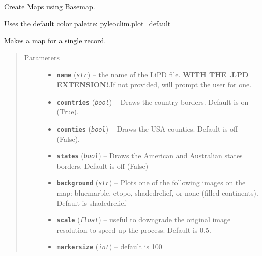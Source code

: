 \documentclass[letterpaper,10pt,english]{sphinxmanual}
\begin{document}
\begin{fulllineitems}
\label{Mapping:pyleoclim.Map}
Create Maps using Basemap.

Uses the default color palette: pyleoclim.plot\_default

\begin{fulllineitems}
\label{Mapping:pyleoclim.Map.map_Lipd}
Makes a map for a single record.
\begin{quote}\begin{description}
\item[{Parameters}] \leavevmode\begin{itemize}
\item {} 
\textbf{\texttt{name}} (\emph{\texttt{str}}) -- the name of the LiPD file. \textbf{WITH THE
.LPD EXTENSION!}.If not provided, will prompt the user for one.

\item {} 
\textbf{\texttt{countries}} (\emph{\texttt{bool}}) -- Draws the country borders. Default is on (True).

\item {} 
\textbf{\texttt{counties}} (\emph{\texttt{bool}}) -- Draws the USA counties. Default is off (False).

\item {} 
\textbf{\texttt{states}} (\emph{\texttt{bool}}) -- Draws the American and Australian states borders.
Default is off (False)

\item {} 
\textbf{\texttt{background}} (\emph{\texttt{str}}) -- Plots one of the following images on the map:
bluemarble, etopo, shadedrelief, or none (filled continents).
Default is shadedrelief

\item {} 
\textbf{\texttt{scale}} (\emph{\texttt{float}}) -- useful to downgrade the original image resolution
to speed up the process. Default is 0.5.

\item {} 
\textbf{\texttt{markersize}} (\emph{\texttt{int}}) -- default is 100


\end{itemize}
\end{description}
\end{quote}
\end{fulllineitems}
\end{fulllineitems}
\end{document}
